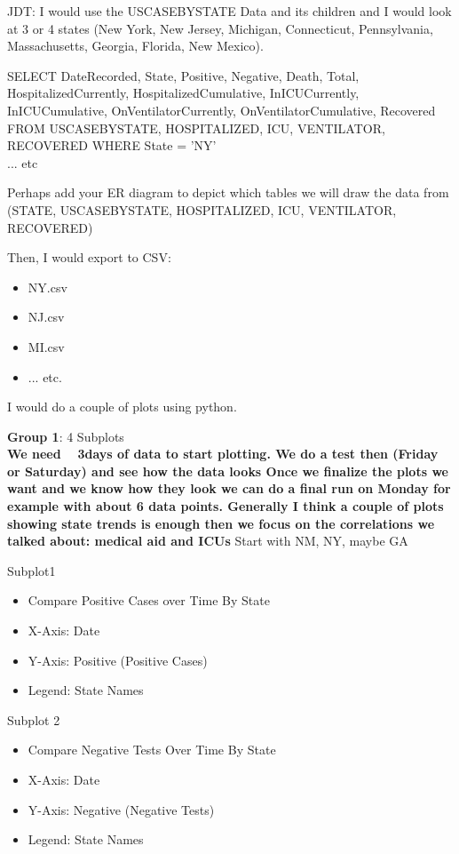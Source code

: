 \documentclass[11pt]{article}
\begin{document}
\noindent
JDT: I would use the USCASEBYSTATE Data and its children and I would look at 3 or 4 states (New York, New Jersey, Michigan, Connecticut, Pennsylvania, Massachusetts, Georgia, Florida, New Mexico).

\noindent
SELECT DateRecorded, State, Positive, Negative, Death, Total, HospitalizedCurrently, HospitalizedCumulative, InICUCurrently, InICUCumulative, OnVentilatorCurrently, OnVentilatorCumulative, Recovered FROM USCASEBYSTATE, HOSPITALIZED, ICU, VENTILATOR, RECOVERED WHERE State = 'NY' \\
\noindent
... etc

\noindent Perhaps add your ER diagram to depict which tables we will draw the data from (STATE, USCASEBYSTATE, HOSPITALIZED, ICU, VENTILATOR, RECOVERED)

\noindent
Then, I would export to CSV:
\begin{itemize}
    \item NY.csv
    \item NJ.csv
    \item MI.csv
    \item ... etc.
\end{itemize}

\noindent
I would do a couple of plots using python.

\pagebreak

\noindent
\textbf{Group 1}: 4 Subplots \\

\textbf{We need ~ 3days of data to start plotting. We do a test then (Friday or Saturday) and see how the data looks Once we finalize the plots we want and we know how they look we can do a final run on Monday for example with about 6 data points. Generally I think a couple of plots showing state trends is enough then we focus on the correlations we talked about: medical aid and ICUs} Start with NM, NY, maybe GA

\noindent
Subplot1
\begin{itemize}
    \item Compare Positive Cases over Time By State
    \item X-Axis: Date
    \item Y-Axis: Positive (Positive Cases)
    \item Legend: State Names
\end{itemize}

\noindent
Subplot 2
\begin{itemize}
    \item Compare Negative Tests Over Time By State
    \item X-Axis: Date
    \item Y-Axis: Negative (Negative Tests)
    \item Legend: State Names
\end{itemize}
\end{document}
